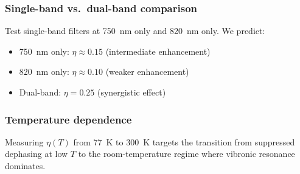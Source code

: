 \documentclass[11pt,a4paper]{article}
\begin{document}
\subsubsection*{Single-band vs.\ dual-band comparison}

Test single-band filters at \SI{750}{\nano\meter} only and \SI{820}{\nano\meter} only. We predict:
\begin{itemize}
    \item \SI{750}{\nano\meter} only: $\eta \approx 0.15$ (intermediate enhancement)
    \item \SI{820}{\nano\meter} only: $\eta \approx 0.10$ (weaker enhancement)
    \item Dual-band: $\eta = 0.25$ (synergistic effect)
\end{itemize}

\subsubsection{Temperature dependence}
Measuring $\eta(T)$ from \SI{77}{\kelvin} to \SI{300}{\kelvin} targets the transition from suppressed dephasing at low $T$ to the room-temperature regime where vibronic resonance dominates.





\end{document}
